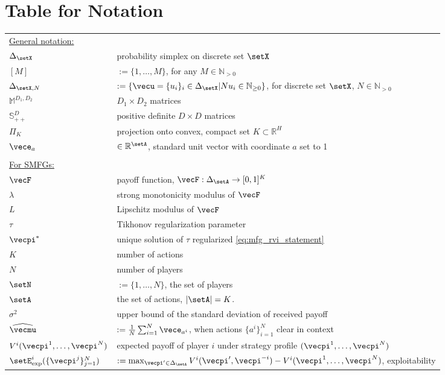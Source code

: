 \section{Table for Notation}
\begin{longtable}{ p{}  p{} } 
\underline{General notation:} & \\
$\Delta_\setX$ & probability simplex on discrete set $\setX$ \\ 
$[M]$ & $:= \{1, \ldots, M\}$, for any $M\in\mathbb{N}_{>0}$ \\
$\Delta_{\setX, N}$ & $:= \{ \vecu = \{u_i\}_i \in\Delta_\setX | N u_i \in \mathbb{N}_{\geq 0} \}$, for discrete set $\setX$, $N\in\mathbb{N}_{>0}$ \\
$\mathbb{M}^{D_1,D_2}$ & $D_1 \times D_2$ matrices \\
$\mathbb{S}_{++}^D$ & positive definite $D \times D$ matrices \\
$\Pi_K$ & projection onto convex, compact set $K\subset \mathbb{R}^H$\\
$\vece_a$ & $\in \mathbb{R}^\setA$, standard unit vector with coordinate $a$ set to 1 \\
 &  \\ 
\underline{For SMFGs:} & \\
$\vecF$ & payoff function, $\vecF: \Delta_\setA \rightarrow [0,1]^K$  \\
$\lambda$ & strong monotonicity modulus of $\vecF$ \\  
$L$ & Lipschitz modulus of $\vecF$ \\
$\tau$ & Tikhonov regularization parameter \\ 
$\vecpi^*$ & unique solution of $\tau$ regularized \eqref{eq:mfg_rvi_statement} \\
$K$ & number of actions \\ 
$N$ & number of players \\  
$\setN$ & $:= \{1, \ldots, N \}$, the set of players \\ 
$\setA$ & the set of actions, $|\setA| = K$. \\ 
$\sigma^2$ & upper bound of the standard deviation of received payoff \\
$\widehat{\vecmu}$ & $:= \frac{1}{N} \sum_{i=1}^N \vece_{a^i}$, when actions $\{a^i\}_{i=1}^N$ clear in context \\
$V^i(\vecpi^1, \ldots, \vecpi^N)$ & expected payoff of player $i$ under strategy profile $(\vecpi^1, \ldots, \vecpi^N)$ \\
$\setE^i_{\text{exp}}(\{\vecpi^j\}_{j=1}^N)$ & $:= \max_{\vecpi'\in \Delta_\setA} V^i(\vecpi', \vecpi^{-i}) - V^i(\vecpi^1, \ldots, \vecpi^N)$, exploitability \\

\end{longtable}
